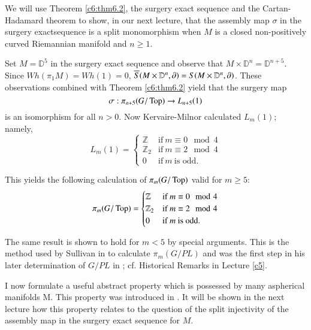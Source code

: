 \setcounter{remark}{0}
\begin{remark}
  We will use Theorem \ref{c6:thm6.2}, the surgery exact sequence and
  the Cartan-Hadamard theorem to show, in our next lecture, that the
  assembly map $\sigma$ in the surgery exact\pageoriginale sequence is a split
  monomorphism when $M$ is a closed non-positively curved Riemannian
  manifold and $n \geq 1$.
\end{remark}

\begin{remark}
  Set $M= \mathbb{D}^5$ in the surgery exact sequence and observe that
  $M \times \mathbb{D}^n = \mathbb{D}^{n+ 5}$. Since $Wh (\pi_1 M)= Wh
  (1) =0$, $\overline{S}(M \times \mathbb{D}^n, \partial) = S (M \times
  \mathbb{D}^n, \partial)$. These observations combined with Theorem
  \ref{c6:thm6.2} yield that the surgery map
  $$
  \sigma : \pi_{n + 5} (G/\operatorname{Top}) \to L_{n+5}(1)
  $$
  is an isomorphism for all $n > 0$. Now Kervaire-Milnor \cite{65}
  calculated $L_m (1)$; namely,
  $$
  L_m (1)= \begin{cases}
    \mathbb{Z} & \text{if}~ m \equiv 0 \mod 4\\
    \mathbb{Z}_2 & \text{if}~ m \equiv 2  \mod 4\\
    0 & \text{if} ~ m ~\text{is odd}.
  \end{cases}
  $$
\end{remark}

This yields the following calculation of $\pi_m (G/\operatorname{Top})$ valid
for $m \geq 5$:
$$
\pi_m (G/ \operatorname{Top})= 
\begin{cases}
    \mathbb{Z} & \text{if}~ m \equiv 0 \mod 4\\
    \mathbb{Z}_2 & \text{if}~ m \equiv 2  \mod 4\\
    0 & \text{if} ~ m ~\text{is odd}.  
\end{cases}
$$

The same result is shown to hold for $m < 5$ by special
arguments. This is the method used by Sullivan in \cite{92} to
calculate $\pi_m (G/PL)$ and was the first step in his later
determination of $G/PL$ in \cite{93}; cf. Historical Remarks in
Lecture \ref{c5}.

I now formulate a useful abstract property which is possessed by many
aspherical manifolds M. This property was introduced in \cite{30}. It
will be shown in the next lecture how this property relates to the
question of the split injectivity of the assembly map in the surgery
exact sequence for $M$.

